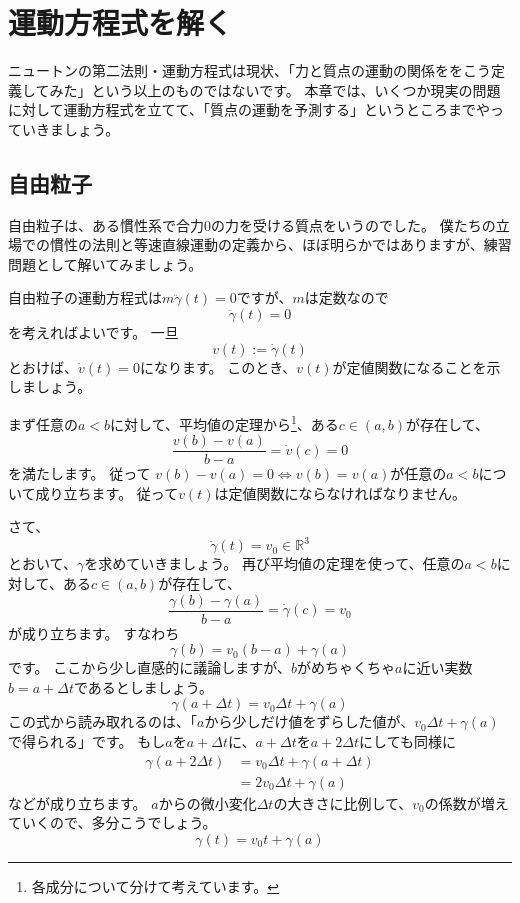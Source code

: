 \chapter{運動方程式を解く}

ニュートンの第二法則・運動方程式は現状、「力と質点の運動の関係ををこう定義してみた」という以上のものではないです。
本章では、いくつか現実の問題に対して運動方程式を立てて、「質点の運動を予測する」というところまでやっていきましょう。



\section{自由粒子}

自由粒子は、ある慣性系で合力0の力を受ける質点をいうのでした。
僕たちの立場での慣性の法則と等速直線運動の定義から、ほぼ明らかではありますが、練習問題として解いてみましょう。

自由粒子の運動方程式は$m\ddot\gamma(t)=0$ですが、$m$は定数なので
\[
  \ddot\gamma(t)=0
\]
を考えればよいです。
一旦
\[
  v(t):=\dot\gamma(t)
\]
とおけば、$\dot{v}(t)=0$になります。
このとき、$v(t)$が定値関数になることを示しましょう。

まず任意の$a<b$に対して、平均値の定理から\footnote{
  各成分について分けて考えています。
}、ある$c\in(a,b)$が存在して、
\[
  \frac{v(b)-v(a)}{b-a}=\dot{v}(c)=0
\]
を満たします。
従って
$v(b)-v(a)=0\iff v(b)=v(a)$が任意の$a<b$について成り立ちます。
従って$v(t)$は定値関数にならなければなりません。

さて、
\[
  \dot\gamma(t)=v_0\in\mathbb{R}^3
\]
とおいて、$\gamma$を求めていきましょう。
再び平均値の定理を使って、任意の$a<b$に対して、ある$c\in(a,b)$が存在して、
\[
  \frac{\gamma(b)-\gamma(a)}{b-a}=\dot\gamma(c)=v_0
\]
が成り立ちます。
すなわち
\[
  \gamma(b)=v_0(b-a)+\gamma(a)
\]
です。
ここから少し直感的に議論しますが、$b$がめちゃくちゃ$a$に近い実数$b=a+\Delta t$であるとしましょう。
\[
  \gamma(a+\Delta t)=v_0\Delta t+\gamma(a)
\]
この式から読み取れるのは、「$a$から少しだけ値をずらした値が、$v_0\Delta t+\gamma(a)$で得られる」です。
もし$a$を$a+\Delta t$に、$a+\Delta t$を$a+2\Delta t$にしても同様に
\begin{align*}
  \gamma(a+2\Delta t)&=v_0\Delta t+\gamma(a+\Delta t)\\
  &=2v_0\Delta t+\gamma(a)
\end{align*}
などが成り立ちます。
$a$からの微小変化$\Delta t$の大きさに比例して、$v_0$の係数が増えていくので、多分こうでしょう。
\[
  \gamma(t)=v_0t+\gamma(a)
\]

